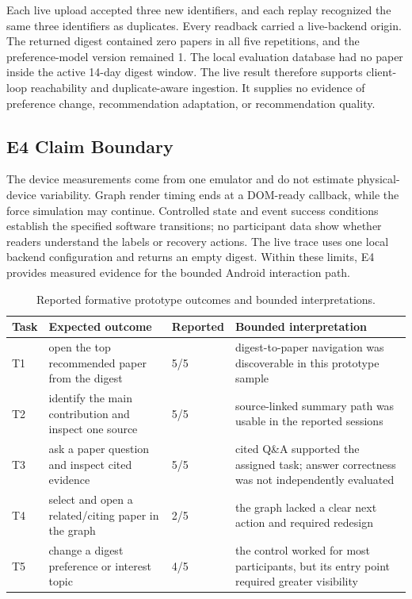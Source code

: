 Each live upload accepted three new identifiers, and each replay recognized the same three identifiers as duplicates.
Every readback carried a live-backend origin.
The returned digest contained zero papers in all five repetitions, and the preference-model version remained 1.
The local evaluation database had no paper inside the active 14-day digest window.
The live result therefore supports client-loop reachability and duplicate-aware ingestion.
It supplies no evidence of preference change, recommendation adaptation, or recommendation quality.

\subsection{E4 Claim Boundary}

The device measurements come from one emulator and do not estimate physical-device variability.
Graph render timing ends at a DOM-ready callback, while the force simulation may continue.
Controlled state and event success conditions establish the specified software transitions; no participant data show whether readers understand the labels or recovery actions.
The live trace uses one local backend configuration and returns an empty digest.
Within these limits, E4 provides measured evidence for the bounded Android interaction path.
\begin{table}[htbp]
\centering
\caption{Reported formative prototype outcomes and bounded interpretations.}
\label{tab:formative-usability}
\begin{tabular}{P{0.8cm}P{5.0cm}P{1.5cm}P{5.7cm}}
\toprule
Task & Expected outcome & Reported & Bounded interpretation \\
\midrule
T1 & open the top recommended paper from the digest & 5/5 & digest-to-paper navigation was discoverable in this prototype sample \\
T2 & identify the main contribution and inspect one source & 5/5 & source-linked summary path was usable in the reported sessions \\
T3 & ask a paper question and inspect cited evidence & 5/5 & cited Q\&A supported the assigned task; answer correctness was not independently evaluated \\
T4 & select and open a related/citing paper in the graph & 2/5 & the graph lacked a clear next action and required redesign \\
T5 & change a digest preference or interest topic & 4/5 & the control worked for most participants, but its entry point required greater visibility \\
\bottomrule
\end{tabular}
\end{table}

